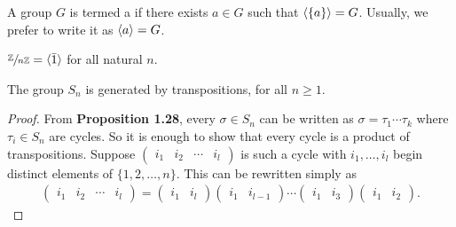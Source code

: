 \begin{definition}
    A group $G$ is termed a  if there exists $a \in G$ such that $\langle\{a\}\rangle = G$. Usually, we prefer to write it as $\langle a\rangle = G$.
\end{definition}

\begin{example}
    $\sfrac{\mathbb{Z}}{n\mathbb{Z}} = \langle\bar{1}\rangle$ for all natural $n$.
\end{example}

\begin{proposition}
    The group $S_{n}$ is generated by transpositions, for all $n \geq 1$.
\end{proposition}

\begin{proof}
    From \textbf{Proposition 1.28}, every $\sigma \in S_{n}$ can be written as $\sigma = \tau_{1} \cdots \tau_{k}$ where $\tau_{i} \in S_{n}$ are cycles. So it is enough to show that every cycle is a product of transpositions. Suppose $\begin{pmatrix}
        i_{1} & i_{2} & \cdots & i_{l}
    \end{pmatrix}$ is such a cycle with $i_{1},\ldots,i_{l}$ begin distinct elements of $\{1,2,\ldots,n\}$. This can be rewritten simply as
    \begin{align}
        \begin{pmatrix}
        i_{1} & i_{2} & \cdots & i_{l}
        \end{pmatrix} = \begin{pmatrix}
            i_{1} & i_{l}
        \end{pmatrix} \begin{pmatrix}
            i_{1} & i_{l-1}
        \end{pmatrix} \cdots \begin{pmatrix}
            i_{1} & i_{3}
        \end{pmatrix} \begin{pmatrix}
            i_{1} & i_{2}
        \end{pmatrix}.
    \end{align}
\end{proof}


